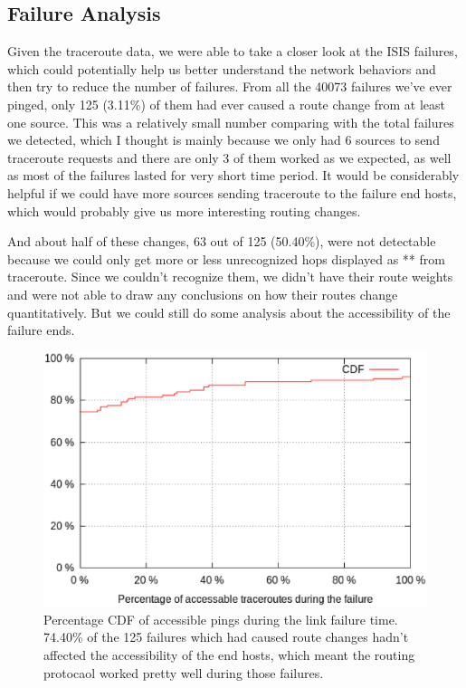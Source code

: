 \documentclass[conference, twocolumn, oneside, 10pt]{IEEEtran}
\begin{document}
\subsection{Failure Analysis}

Given the traceroute data, we were able to take a closer look at the ISIS failures, which could potentially help us better understand the network behaviors and then try to reduce the number of failures. From all the 40073 failures we've ever pinged, only 125 (3.11\%) of them had ever caused a route change from at least one source. This was a relatively small number comparing with the total failures we detected, which I thought is mainly because we only had 6 sources to send traceroute requests and there are only 3 of them worked as we expected, as well as most of the failures lasted for very short time period. It would be considerably helpful if we could have more sources sending traceroute to the failure end hosts, which would probably give us more interesting routing changes.

And about half of these changes, 63 out of 125 (50.40\%), were not detectable because we could only get more or less unrecognized hops displayed as ** from traceroute. Since we couldn't recognize them, we didn't have their route weights and were not able to draw any conclusions on how their routes change quantitatively. But we could still do some analysis about the accessibility of the failure ends.

\begin{figure}[h!]
\centering
\includegraphics[scale=0.4]{plot/accessibility.eps}
\caption{Percentage CDF of accessible pings during the link failure time. 74.40\% of the 125 failures which had caused route changes hadn't affected the accessibility of the end hosts, which meant the routing protocaol worked pretty well during those failures.}
\label{fig:accessibility}
\end{figure}
\end{document}
